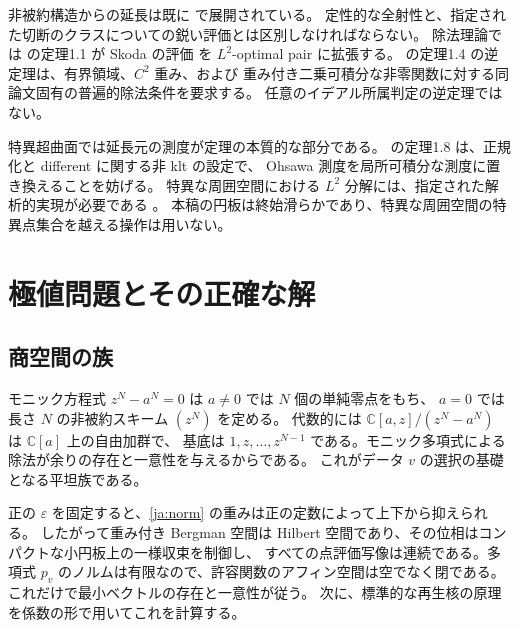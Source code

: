 \documentclass[12pt]{amsart}
\theoremstyle{definition}
\theoremstyle{remark}
\numberwithin{equation}{section}
\newcommand{\C}{\mathbb{C}}
\theoremstyle{definition}
\begin{document}
非被約構造からの延長は既に \cite{Dem17,CDM17,ZZ19,LXZ23} で展開されている。
定性的な全射性と、指定された切断のクラスについての鋭い評価とは区別しなければならない。
除法理論では \cite{LZ26} の定理1.1 が Skoda の評価 \cite{Sk72} を $L^2$-optimal pair に拡張する。
\cite{LMNZ25} の定理1.4 の逆定理は、有界領域、$C^2$ 重み、および
重み付き二乗可積分な非零関数に対する同論文固有の普遍的除法条件を要求する。
任意のイデアル所属判定の逆定理ではない。

特異超曲面では延長元の測度が定理の本質的な部分である。
\cite{KS23} の定理1.8 は、正規化と different に関する非 klt の設定で、
Ohsawa 測度を局所可積分な測度に置き換えることを妨げる。
特異な周囲空間における $L^2$ 分解には、指定された解析的実現が必要である \cite{Wat26}。
本稿の円板は終始滑らかであり、特異な周囲空間の特異点集合を越える操作は用いない。

\section{極値問題とその正確な解}
\subsection{商空間の族}
モニック方程式 $z^N-a^N=0$ は $a\ne0$ では $N$ 個の単純零点をもち、
$a=0$ では長さ $N$ の非被約スキーム $(z^N)$ を定める。
代数的には $\C[a,z]/(z^N-a^N)$ は $\C[a]$ 上の自由加群で、
基底は $1,z,\ldots,z^{N-1}$ である。モニック多項式による除法が余りの存在と一意性を与えるからである。
これがデータ $v$ の選択の基礎となる平坦族である。

正の $\varepsilon$ を固定すると、\eqref{ja:norm} の重みは正の定数によって上下から抑えられる。
したがって重み付き Bergman 空間は Hilbert 空間であり、その位相はコンパクトな小円板上の一様収束を制御し、
すべての点評価写像は連続である。多項式 $p_v$ のノルムは有限なので、許容関数のアフィン空間は空でなく閉である。
これだけで最小ベクトルの存在と一意性が従う。
次に、標準的な再生核の原理 \cite{Ar50} を係数の形で用いてこれを計算する。
\end{document}
